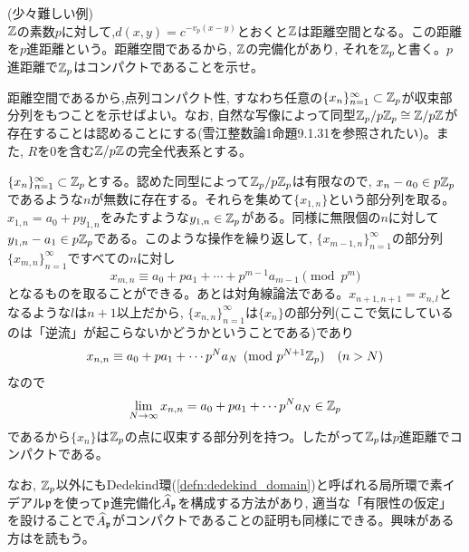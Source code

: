 \begin{egprob} (少々難しい例)\\
$\mathbb{Z}$の素数$p$に対して,$d(x,y) = c^{-v_{p}(x-y)}$とおくと$\mathbb{Z}$は距離空間となる。この距離を$p$進距離という。距離空間であるから, $\mathbb{Z}$の完備化があり, それを$\mathbb{Z}_{p}$と書く。$p$進距離で$\mathbb{Z}_{p}$はコンパクトであることを示せ。
\end{egprob}
\begin{egans}
距離空間であるから,点列コンパクト性, すなわち任意の$\{ x_n \}_{n=1}^{\infty} \subset \mathbb{Z}_{p}$が収束部分列をもつことを示せばよい。なお, 自然な写像によって同型$\mathbb{Z}_{p}/p\mathbb{Z}_{p} \cong \mathbb{Z}/p\mathbb{Z}$が存在することは認めることにする(雪江整数論1命題9.1.31を参照されたい)。また, $R$を0を含む$\mathbb{Z}/p\mathbb{Z}$の完全代表系とする。

$\{ x_n \}_{n=1}^{\infty}\subset \mathbb{Z}_{p}$とする。認めた同型によって$\mathbb{Z}_{p}/p\mathbb{Z}_{p}$は有限なので, $x_n - a_0 \in p\mathbb{Z}_{p}$であるような$n$が無数に存在する。それらを集めて$\{ x_{1,n}\}$という部分列を取る。$x_{1,n} = a_0 + p y_{1,n}$をみたすような$y_{1,n}\in \mathbb{Z}_{p}$がある。同様に無限個の$n$に対して$y_{1,n} - a_1 \in p\mathbb{Z}_{p}$である。このような操作を繰り返して, $\{ x_{m-1,n}\}_{n=1}^{\infty}$の部分列$\{ x_{m,n}\}_{n=1}^{\infty}$ですべての$n$に対し
\[x_{m,n} \equiv a_0 + p a_1 + \cdots + p^{m-1}a_{m-1} \pmod{p^{m} }\]
となるものを取ることができる。あとは対角線論法である。$x_{n+1,n+1} = x_{n,l}$となるような$l$は$n+1$以上だから, $\{ x_{n,n}\}_{n=1}^{\infty}$は$\{ x_n \}$の部分列(ここで気にしているのは「逆流」が起こらないかどうかということである)であり
\[x_{n,n} \equiv a_0 + p a_1 + \cdots p^{N} a_N \pmod{p^{N+1}\mathbb{Z}_{p}}\quad (n>N)\]
なので
\[\displaystyle\lim_{N\to \infty} x_{n,n} = a_{0} + p a_1 + \cdots p^{N}a_N \in \mathbb{Z}_{p} \]
であるから$\{ x_n \}$は$\mathbb{Z}_{p}$の点に収束する部分列を持つ。したがって$\mathbb{Z}_{p}$は$p$進距離でコンパクトである。

なお, $\mathbb{Z}_{p}$以外にもDedekind環(\ref{defn:dedekind_domain})と呼ばれる局所環で素イデアル$\mathfrak{p}$を使って$\mathfrak{p}$進完備化$\widehat{A}_{\mathfrak{p}}$を構成する方法があり, 適当な「有限性の仮定」を設けることで$\widehat{A}_{\mathfrak{p}}$がコンパクトであることの証明も同様にできる。興味がある方は\cite{momoyukie}を読もう。
\end{egans}

\clearpage
